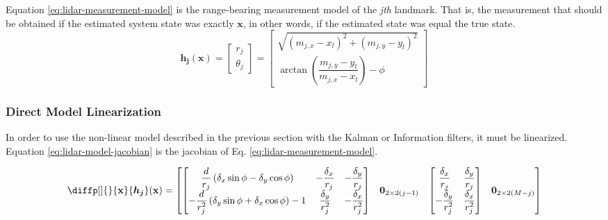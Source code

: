 \documentclass[12pt]{article}
\newcommand{\bvec}[1]{\boldsymbol{\mathbf{#1}}} %
\newcommand{\mat}[1]{\boldsymbol{\mathbf{#1}}}
\newcommand{\parentheses}[1]{\left(#1\right)}
\newcommand{\mb}[1]{{\boldsymbol{#1}}} %
\newcommand{\matnull}[2]{\mat{0}_{#1\times#2}} %
\begin{document}
Equation \ref{eq:lidar-measurement-model} is the range-bearing measurement model of the \textit{jth} landmark. That is, the measurement that should be obtained if the estimated system state was exactly $\mathbf{x}$, in other words, if the estimated state was equal the true state.
\renewcommand{\arraystretch}{1.5}
\begin{equation}
    \mb{h_j}(\mathbf{x}) = \begin{bmatrix}
        r_j \\ \theta_j     
    \end{bmatrix} = 
    \begin{bmatrix}
        \sqrt{(m_{j,x} - x_l)^2 + (m_{j, y} - y_l)^2} \\
        \arctan\left(\dfrac{m_{j,y} - y_l}{m_{j,x} - x_l}\right) - \phi
    \end{bmatrix}
    \label{eq:lidar-measurement-model}
\end{equation}
\renewcommand{\arraystretch}{1.0}

\subsubsection{Direct Model Linearization}
In order to use the non-linear model described in the previous section with the Kalman or Information filters, it must be linearized. Equation \ref{eq:lidar-model-jacobian} is the jacobian of Eq. \ref{eq:lidar-measurement-model}.

\renewcommand{\arraystretch}{1.5}
\begin{equation}
    \diffp[]{}{\bvec{x}} \mb{h_j}(\bvec{x}) = \begin{bmatrix}
        \begin{bmatrix}
            \dfrac{d}{r_j}\parentheses{\delta_x \sin\phi - \delta_y \cos\phi} &  -\dfrac{\delta_x}{r_j} & -\dfrac{\delta_y}{r_j}\\
            -\dfrac{d}{r_j^2}\parentheses{\delta_y \sin\phi + \delta_x \cos\phi} - 1 & \dfrac{\delta_y}{r_j^2} & -\dfrac{\delta_x}{r_j^2}
        \end{bmatrix} &
        \matnull{2}{2(j-1)} &
        \begin{bmatrix}
            \dfrac{\delta_x}{r_j} & \dfrac{\delta_y}{r_j} \\
            -\dfrac{\delta_y}{r_j^2} & \dfrac{\delta_x}{r_j^2}
        \end{bmatrix} &
        \matnull{2}{2(M-j)} 
    \end{bmatrix} 
    \label{eq:lidar-model-jacobian}
\end{equation}
\renewcommand{\arraystretch}{1.0}
\end{document}

